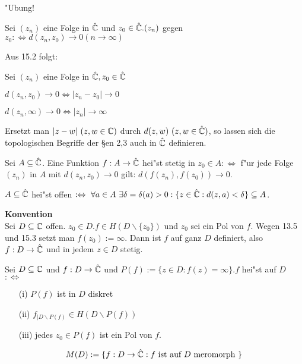 \documentclass{article}
\begin{document}
\begin{beweis}
"Ubung!
\end{beweis}

\begin{definition}
Sei $(z_n)$ eine Folge in $\hat{\mathbb{C}}$ und $z_0 \in \hat{\mathbb{C}}. (z_n)$  gegen $z_0 :\Leftrightarrow d(z_n,z_0) \rightarrow 0 (n \rightarrow \infty)$
\end{definition}

Aus 15.2 folgt:
\begin{satz}
Sei $(z_n)$ eine Folge in $\hat{\mathbb{C}}, z_0 \in \hat{\mathbb{C}}$
\begin{liste}
\item $d(z_n,z_0) \rightarrow 0 \Leftrightarrow |z_n-z_0| \rightarrow 0$
\item $d(z_n,\infty) \rightarrow 0 \Leftrightarrow |z_n| \rightarrow \infty$
\end{liste}
\end{satz}

Ersetzt man $|z-w| \ (z,w \in \mathbb{C})$ durch $d(z,w) \ (z,w \in \hat{\mathbb{C}})$, so lassen sich die topologischen Begriffe der §en 2,3 auch in $\hat{\mathbb{C}}$ definieren.

\begin{beispiele}
\item Sei $A \subseteq \hat{\mathbb{C}}$. Eine Funktion $f: A \rightarrow \hat{\mathbb{C}}$ hei"st stetig in $z_0 \in A :\Leftrightarrow$ f"ur jede Folge $(z_n)$ in $A$ mit $d(z_n,z_0) \rightarrow 0$ gilt: $d(f(z_n),f(z_0)) \rightarrow 0$.
\item $A \subseteq \hat{\mathbb{C}}$ hei"st offen $: \Leftrightarrow \ \forall a \in A \ \exists \delta = \delta(a) > 0: \{ z \in \hat{\MdC}: d(z,a) < \delta \} \subseteq A$.
\end{beispiele}

{\bf Konvention}\\
Sei $D \subseteq \mathbb{C}$ offen. $z_0 \in D. f \in H(D \backslash\{z_0\})$ und $z_0$ sei ein  Pol von $f$. Wegen 13.5 und 15.3 setzt man $f(z_0):=\infty$. Dann ist $f$ auf ganz $D$ definiert, also $f: D \rightarrow \hat{\mathbb{C}}$ und in jedem $z \in D$ stetig.

\begin{definition}
Sei $D \subseteq \mathbb{C}$ und $f: D \rightarrow \hat{\mathbb{C}}$ und $P(f) := \{ z \in D: f(z) = \infty\}. f$ hei"st auf $D$  $:\Leftrightarrow$
\begin{itemize}
\item[(i)] $P(f)$ ist in $D$ diskret
\item[(ii)] $f_{|D \backslash P(f)} \in H( D \backslash P(f))$
\item[(iii)] jedes $z_0 \in P(f)$ ist ein Pol von $f$.
\end{itemize}
\end{definition}
\[
M(D) := \{ f: D \rightarrow \hat{\mathbb{C}}: f \mbox{ ist auf } D \mbox{ meromorph } \}
\]
\end{document}
